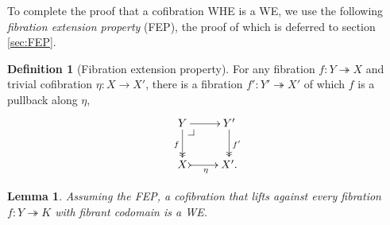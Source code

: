 \documentclass[12pt]{article}
\makeatletter
\newcommand{\ra}{\ensuremath{\rightarrow}}
\newcommand{\onto}{\ensuremath{\twoheadrightarrow}}
\newtheorem{proposition}[theorem]{Proposition}
\newtheorem{lemma}[theorem]{Lemma}
\theoremstyle{remark}
\theoremstyle{definition}
\newtheorem{definition}[theorem]{Definition}
\newcommand{\pbcorner}[1][dr]{\save*!/#1-1.2pc/#1:(-1,1)@^{|-}\restore}
\makeatother
\begin{document}

To complete the proof that a cofibration WHE is a WE, we use the following \emph{fibration extension property} (FEP), the proof of which is deferred to section \ref{sec:FEP}.

\begin{definition}[Fibration extension property]\label{def:fibextreplace}
For any fibration $ f : Y \onto X$ and trivial cofibration $\eta: X\ra X'$,
there is a fibration $f' : Y' \onto X'$ of which $f$ is a pullback along $\eta$, 
\begin{equation}\label{diagram:FEP}
\xymatrix{
Y \ar@{->>}[d]_{f} \ar[r]  \pbcorner & Y' \ar@{>>}[d]^{f'} \\
X \ar@{>->}[r]_{\eta} &  X'.
}
\end{equation}
\end{definition}

\begin{lemma}\label{lemma:CofWEiffFibLift}
Assuming the FEP, a cofibration that lifts against every fibration $f : Y\onto K$ with fibrant codomain is a WE.
\end{lemma}
\end{document}
